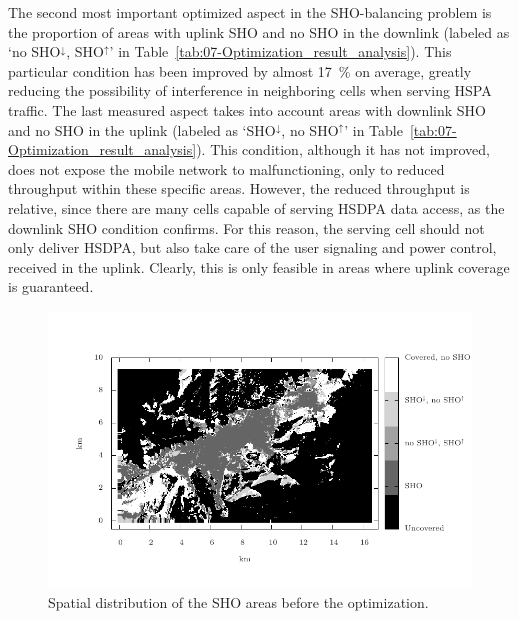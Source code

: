 The second most important optimized aspect in the SHO-balancing problem
is the proportion of areas with uplink SHO and no SHO in the downlink
(labeled as `no SHO$^{\downarrow}$, SHO$^{\uparrow}$' in Table~\ref{tab:07-Optimization_result_analysis}).
This particular condition has been improved by almost 17~\% on average,
greatly reducing the possibility of interference in neighboring cells
when serving HSPA traffic. The last measured aspect takes into account
areas with downlink SHO and no SHO in the uplink (labeled as `SHO$^{\downarrow}$,
no SHO$^{\uparrow}$' in Table~\ref{tab:07-Optimization_result_analysis}).
This condition, although it has not improved, does not expose the
mobile network to malfunctioning, only to reduced throughput within
these specific areas. However, the reduced throughput is relative,
since there are many cells capable of serving HSDPA data access, as
the downlink SHO condition confirms. For this reason, the serving
cell should not only deliver HSDPA, but also take care of the user
signaling and power control, received in the uplink. Clearly, this
is only feasible in areas where uplink coverage is guaranteed.

\begin{figure}
\centering

\includegraphics[width=1\textwidth]{07-experimental_evaluation-sho_balancing/img/sho_areas_initial}

\caption{Spatial distribution of the SHO areas before the optimization.\label{fig:07-SHO_areas_initial}}
\end{figure}


